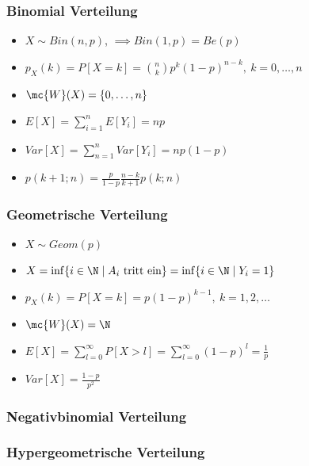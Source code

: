 \subsubsection{Binomial Verteilung}
\begin{itemize}
    \item $X \sim Bin(n, p)$, $\implies Bin(1, p) = Be(p)$
    \item $p_X(k) = P[X = k] = {n\choose k} p^k (1 - p)^{n - k}, \ k = 0, \dots, n$
    \item $\mc{W}(X) = \{0, \dots, n\}$
    \item $E[X] = \sum_{i=1}^{n} E[Y_i] = np$
    \item $Var[X] = \sum_{n=1}^{n} Var[Y_i] = np(1 - p)$
    \item $p(k + 1; n) = \frac{p}{1 - p}\frac{n - k}{k + 1} p(k; n)$
\end{itemize}

\subsubsection{Geometrische Verteilung}
\begin{itemize}
    \item $X \sim Geom(p)$
    \item $X = \inf \{i \in \N \mid A_i \text{ tritt ein}\} = \inf \{i \in \N \mid Y_i = 1\}$
    \item $p_X(k) = P[X = k] = p(1 - p)^{k - 1}, \ k = 1, 2, \dots$
    \item $\mc{W}(X) = \N$
    \item $E[X] = \sum_{l=0}^{\infty} P[X > l] = \sum_{l=0}^{\infty} (1 - p)^l = \frac{1}{p}$
    \item $Var[X] = \frac{1 - p}{p^2}$
\end{itemize}

\subsubsection{Negativbinomial Verteilung}

\subsubsection{Hypergeometrische Verteilung}

